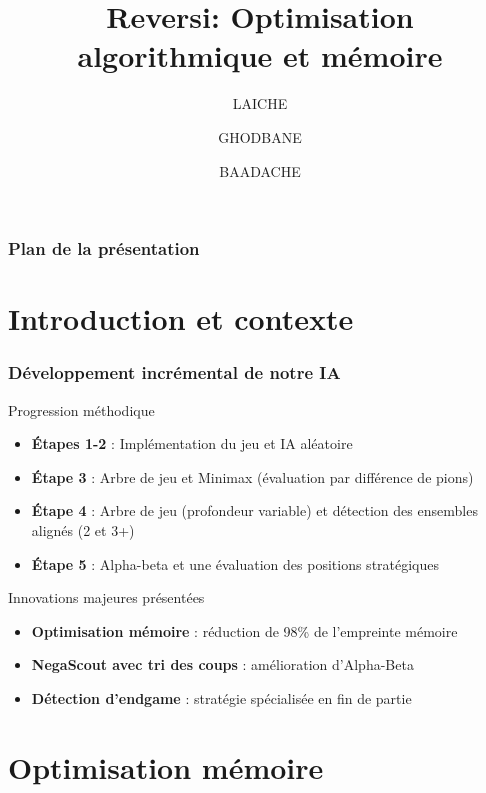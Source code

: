 \documentclass{beamer}
\title[Optimisation IA pour Reversi]{Reversi: Optimisation algorithmique et mémoire}
\author{LAICHE\and GHODBANE\and BAADACHE}
\begin{document}
\begin{frame}
    \titlepage
\end{frame}

\begin{frame}
    \frametitle{Plan de la présentation}
    \tableofcontents
\end{frame}

\section{Introduction et contexte}

\begin{frame}
    \frametitle{Développement incrémental de notre IA}
    
    \begin{block}{Progression méthodique}
    \small
    \begin{itemize}
        \item \textbf{Étapes 1-2} : Implémentation du jeu et IA aléatoire
        \item \textbf{Étape 3} : Arbre de jeu et Minimax (évaluation par différence de pions)
        \item \textbf{Étape 4} : Arbre de jeu (profondeur variable) et détection des ensembles alignés (2 et 3+)
        \item \textbf{Étape 5} : Alpha-beta et une évaluation des positions stratégiques
    \end{itemize}
    \end{block}
    
    \begin{block}{Innovations majeures présentées}
    \small
    \begin{itemize}
        \item \textbf{Optimisation mémoire} : réduction de 98\% de l'empreinte mémoire
        \item \textbf{NegaScout avec tri des coups} : amélioration d'Alpha-Beta
        \item \textbf{Détection d'endgame} : stratégie spécialisée en fin de partie
    \end{itemize}
    \end{block}
\end{frame}

\section{Optimisation mémoire}
\end{document}

